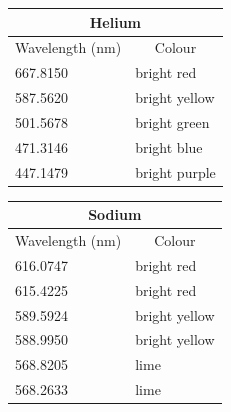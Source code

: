 \begin{margintable}
\normalsize
\begin{tabular}{|l|l|}
\hline
\multicolumn{2}{|c|}{Helium}                                        \\ \hline
\multicolumn{1}{|c|}{Wavelength (nm)} & \multicolumn{1}{c|}{Colour} \\ \hline
667.8150                              & bright red                  \\ \hline
587.5620                              & bright yellow\;\;\;\;\;               \\ \hline
501.5678                              & bright green                \\ \hline
471.3146                              & bright blue                 \\ \hline
447.1479                              & bright purple               \\ \hline
\end{tabular}
\end{margintable}

\begin{margintable}
\normalsize
\begin{tabular}{|l|l|}
\hline
\multicolumn{2}{|c|}{Sodium}                                        \\ \hline
\multicolumn{1}{|c|}{Wavelength (nm)} & \multicolumn{1}{c|}{Colour} \\ \hline
616.0747                              & bright red                  \\ \hline
615.4225                              & bright red                  \\ \hline
589.5924                              & bright yellow\;\;\;\;\;        \\ \hline
588.9950                              & bright yellow               \\ \hline
568.8205                              & lime                        \\ \hline
568.2633                              & lime                        \\ \hline
\end{tabular}
\end{margintable}

